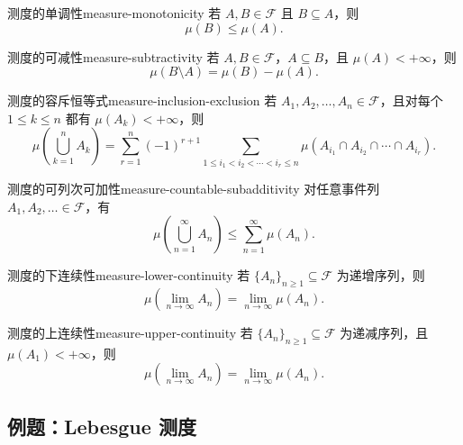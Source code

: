 \begin{proposition}{测度的单调性}{measure-monotonicity}
若 $A,B\in\mathscr{F}$ 且 $B\subseteq A$，则
\[
\mu(B)\leq\mu(A).
\]
\end{proposition}

\begin{proposition}{测度的可减性}{measure-subtractivity}
若 $A,B\in\mathscr{F}$，$A\subseteq B$，且 $\mu(A)<+\infty$，则
\[
\mu(B\setminus A)=\mu(B)-\mu(A).
\]
\end{proposition}

\begin{proposition}{测度的容斥恒等式}{measure-inclusion-exclusion}
若 $A_1,A_2,\ldots,A_n\in\mathscr{F}$，且对每个 $1\leq k\leq n$ 都有 $\mu(A_k)<+\infty$，则
\[
\mu\left(\bigcup_{k=1}^{n}A_k\right)
=\sum_{r=1}^{n}(-1)^{r+1}
\sum_{1\leq i_1<i_2<\cdots<i_r\leq n}
\mu(A_{i_1}\cap A_{i_2}\cap\cdots\cap A_{i_r}).
\]
\end{proposition}

\begin{mytheorem}{测度的可列次可加性}{measure-countable-subadditivity}
对任意事件列 $A_1,A_2,\ldots\in\mathscr{F}$，有
\[
\mu\left(\bigcup_{n=1}^{\infty}A_n\right)
\leq\sum_{n=1}^{\infty}\mu(A_n).
\]
\end{mytheorem}

\begin{proposition}{测度的下连续性}{measure-lower-continuity}
若 $\{A_n\}_{n\geq1}\subseteq\mathscr{F}$ 为递增序列，则
\[
\mu\left(\lim_{n\to\infty}A_n\right)
=\lim_{n\to\infty}\mu(A_n).
\]
\end{proposition}

\begin{proposition}{测度的上连续性}{measure-upper-continuity}
若 $\{A_n\}_{n\geq1}\subseteq\mathscr{F}$ 为递减序列，且 $\mu(A_1)<+\infty$，则
\[
\mu\left(\lim_{n\to\infty}A_n\right)
=\lim_{n\to\infty}\mu(A_n).
\]
\end{proposition}

\subsection{例题：Lebesgue 测度}\label{note:c1:e13}
